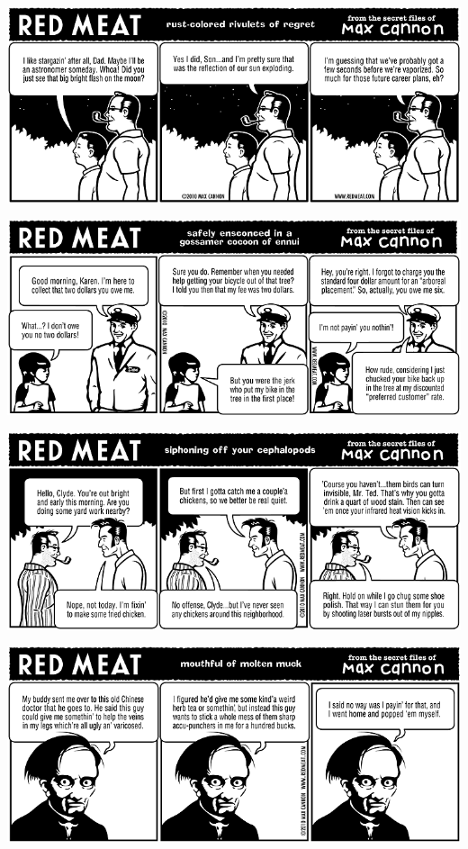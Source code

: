 \documentclass[a4paper,twoside,11pt]{article}
\begin{document}
\includegraphics[width=\textwidth]{redmeat_2010-01-12.png}



\includegraphics[width=\textwidth]{redmeat_2010-01-19.png}



\includegraphics[width=\textwidth]{redmeat_2010-01-26.png}



\includegraphics[width=\textwidth]{redmeat_2010-02-02.png}
\end{document}
